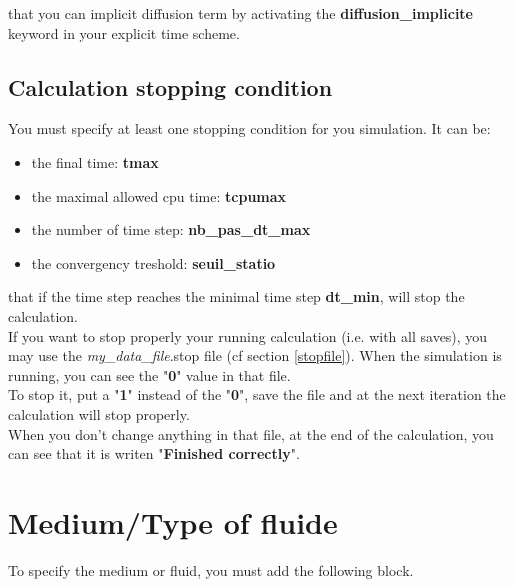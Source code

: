 \Note that you can implicit diffusion term by activating the \textbf{diffusion\_implicite} keyword in your explicit time scheme.



\subsection{Calculation stopping condition}
You must specify at least one stopping condition for you simulation.
It can be:
\begin{itemize}
\item the final time: \textbf{tmax}
\item the maximal allowed cpu time: \textbf{tcpumax}
\item the number of time step: \textbf{nb\_pas\_dt\_max}
\item the convergency treshold: \textbf{seuil\_statio}
\end{itemize}

\Note that if the time step reaches the minimal time step \textbf{dt\_min}, \trust will stop the calculation.\\

If you want to stop properly your running calculation (i.e. with all saves), you may use the \textit{my\_data\_file}.stop file (cf section \ref{stopfile}).
When the simulation is running, you can see the "\textbf{0}" value in that file.\\

To stop it, put a "\textbf{1}" instead of the "\textbf{0}", save the file and at the next iteration the calculation will stop properly.\\

When you don't change anything in that file, at the end of the calculation, you can see that it is writen "\textbf{Finished correctly}".


\section{Medium/Type of fluide}
To specify the medium or fluid, you must add the following block.

    \begin{center}
    \end{center}

